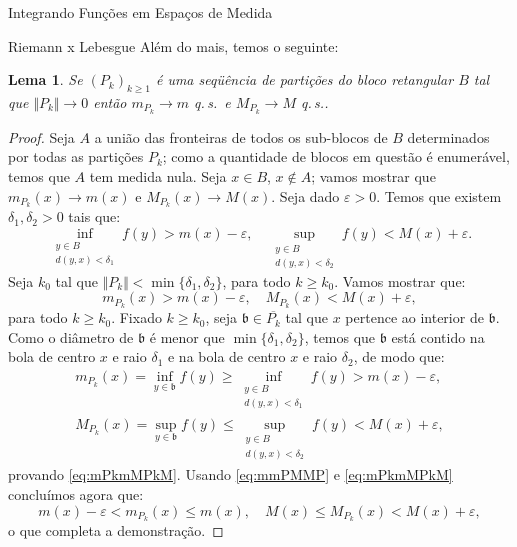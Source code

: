 \documentclass[oneside,final,11pt]{amsbook}
\newcommand{\qs}{\hbox{q.$\,$s.}}
\theoremstyle{remark}\newtheorem{exercise}{Exercício}[chapter]
\theoremstyle{remark}\newtheorem{*exercise}[exercise]{\hbox to 0pt{\hskip 0pt minus 1fil*}Exercício}
\theoremstyle{definition}\newtheorem{exdefin}{Definição}[chapter]
\theoremstyle{plain}\newtheorem{teo}{Teorema}[section]
\theoremstyle{plain}\newtheorem{lem}[teo]{Lema}
\theoremstyle{plain}\newtheorem{prop}[teo]{Proposição}
\theoremstyle{plain}\newtheorem{cor}[teo]{Corolário}
\theoremstyle{definition}\newtheorem{defin}[teo]{Definição}
\theoremstyle{remark}\newtheorem{rem}[teo]{Observação}
\theoremstyle{definition}\newtheorem{notation}[teo]{Notação}
\theoremstyle{definition}\newtheorem{convention}[teo]{Convenção}
\theoremstyle{definition}\newtheorem{example}[teo]{Exemplo}
\numberwithin{section}{chapter}
\numberwithin{equation}{section}
\begin{document}
\begin{chapter}{Integrando Funções em Espaços de Medida}
\begin{section}{Riemann x Lebesgue}
Além do mais, temos o seguinte:
\begin{lem}\label{thm:PktomM}
Se $(P_k)_{k\ge1}$ é uma seqüência de partições do bloco retangular $B$ tal que $\Vert P_k\Vert\to0$
então $m_{P_k}\to m$ \qs\ e $M_{P_k}\to M$ \qs.
\end{lem}
\begin{proof}
Seja $A$ a união das fronteiras de todos os sub-blocos de $B$ determinados por todas as partições
$P_k$; como a quantidade de blocos em questão é enumerável, temos que $A$ tem medida nula.
Seja $x\in B$, $x\not\in A$; vamos mostrar que $m_{P_k}(x)\to m(x)$ e $M_{P_k}(x)\to M(x)$.
Seja dado $\varepsilon>0$. Temos que existem $\delta_1,\delta_2>0$ tais que:
\[\inf_{\substack{y\in B\\d(y,x)<\delta_1}}\!\!f(y)>m(x)-\varepsilon,\quad
\sup_{\substack{y\in B\\d(y,x)<\delta_2}}\!\!f(y)<M(x)+\varepsilon.\]
Seja $k_0$ tal que $\Vert P_k\Vert<\min\{\delta_1,\delta_2\}$, para todo $k\ge k_0$.
Vamos mostrar que:
\begin{equation}\label{eq:mPkmMPkM}
m_{P_k}(x)>m(x)-\varepsilon,\quad M_{P_k}(x)<M(x)+\varepsilon,
\end{equation}
para todo $k\ge k_0$. Fixado $k\ge k_0$, seja $\mathfrak b\in\overline{P_k}$ tal que
$x$ pertence ao interior de $\mathfrak b$. Como o diâmetro de $\mathfrak b$
é menor que $\min\{\delta_1,\delta_2\}$, temos que $\mathfrak b$ está contido na bola
de centro $x$ e raio $\delta_1$ e na bola de centro $x$ e raio $\delta_2$, de modo que:
\begin{gather*}
m_{P_k}(x)=\inf_{y\in\mathfrak b}f(y)\ge\!\!\!\inf_{\substack{y\in B\\d(y,x)<\delta_1}}\!\!f(y)>m(x)-\varepsilon,\\
M_{P_k}(x)=\sup_{y\in\mathfrak b}f(y)\le\!\!\!\sup_{\substack{y\in B\\d(y,x)<\delta_2}}\!\!f(y)<M(x)+\varepsilon,
\end{gather*}
provando \eqref{eq:mPkmMPkM}.
Usando \eqref{eq:mmPMMP} e \eqref{eq:mPkmMPkM} concluímos agora que:
\[m(x)-\varepsilon<m_{P_k}(x)\le m(x),\quad M(x)\le M_{P_k}(x)<M(x)+\varepsilon,\]
o que completa a demonstração.
\end{proof}


\end{section}
\end{chapter}
\end{document}
